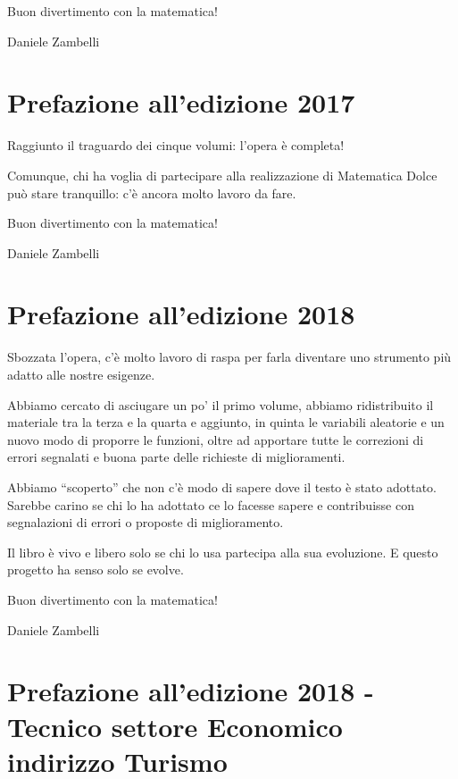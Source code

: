 Buon divertimento con la matematica!

\begin{flushright}
Daniele Zambelli
\end{flushright}

\section{Prefazione all'edizione 2017}

Raggiunto il traguardo dei cinque volumi: l'opera è completa!

Comunque, chi ha voglia di partecipare alla realizzazione di Matematica Dolce
può stare tranquillo:
c'è ancora molto lavoro da fare.

Buon divertimento con la matematica!

\begin{flushright}
Daniele Zambelli
\end{flushright}

\section{Prefazione all'edizione 2018}

Sbozzata l'opera, c'è molto lavoro di raspa per farla diventare uno
strumento più adatto alle nostre esigenze.

Abbiamo cercato di asciugare un po' il primo volume, abbiamo ridistribuito
il materiale tra la terza e la quarta e aggiunto, in quinta le variabili
aleatorie e un nuovo modo di proporre le funzioni,
oltre ad apportare tutte le correzioni di errori segnalati e buona parte
delle richieste di miglioramenti.

Abbiamo ``scoperto'' che non c'è modo di sapere dove il testo è stato
adottato. Sarebbe carino se chi lo ha adottato ce lo facesse sapere e
contribuisse con segnalazioni di errori o proposte di miglioramento.

Il libro è vivo e libero solo se chi lo usa partecipa alla sua evoluzione.
E questo progetto ha senso solo se evolve.

Buon divertimento con la matematica!

\begin{flushright}
Daniele Zambelli
\end{flushright}

%
\section{Prefazione all'edizione 2018 - Tecnico settore Economico indirizzo Turismo}

